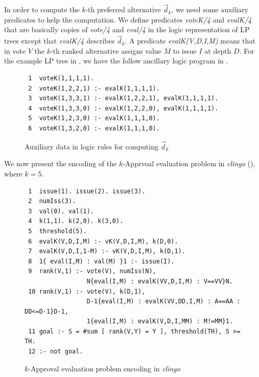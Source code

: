 In order to compute the $k$-th preferred alternative $\vec{d}_k$, we need
some auxiliary predicates to help the computation.  We define predicates
\textit{voteK/4} and \textit{evalK/4} that are basically copies 
of \textit{vote/4} and \textit{eval/4} in
the logic representation of LP trees except that \textit{evalK/4} describes
$\vec{d}_k$.  A predicate \textit{evalK(V,D,I,M)} means that in vote $V$
the $k$-th ranked alternative assigns value $M$ to issue $I$ at depth $D$.
For the example LP tree in , we have the follow ancillary
logic program in .

\begin{figure}[H]
   \small
	\begin{framed}
		\begin{verbatim}
 1  voteK(1,1,1,1).
 2  voteK(1,2,2,1) :- evalK(1,1,1,1).
 3  voteK(1,3,3,1) :- evalK(1,2,2,1), evalK(1,1,1,1).
 4  voteK(1,3,3,0) :- evalK(1,2,2,0), evalK(1,1,1,1).
 5  voteK(1,2,3,0) :- evalK(1,1,1,0).
 6  voteK(1,3,2,0) :- evalK(1,1,1,0).
		\end{verbatim}
	\end{framed}
	\caption{Auxiliary data in logic rules for computing $\vec{d}_k$ }
  \label{fig:LPTreeASP_aux}
\end{figure}

We now present the encoding of the $k$-Apprvoal evaluation problem in \emph{clingo}
(), where $k=5$.
\begin{figure}[ht]
  \centering
	\begin{framed}
	\small
		\begin{verbatim}
 1  issue(1). issue(2). issue(3).
 2  numIss(3).
 3  val(0). val(1).
 4  k(1,1). k(2,0). k(3,0).
 5  threshold(5).
 6  evalK(V,D,I,M) :- vK(V,D,I,M), k(D,0).
 7  evalK(V,D,I,1-M) :- vK(V,D,I,M), k(D,1).
 8  1{ eval(I,M) : val(M) }1 :- issue(I).
 9  rank(V,1) :- vote(V), numIss(N),
                 N{eval(I,M) : evalK(VV,D,I,M) : V==VV}N.
 10 rank(V,1) :- vote(V), k(D,1), 
                 D-1{eval(I,M) : evalK(VV,DD,I,M) : A==AA : DD<=D-1}D-1,
                 1{eval(I,M) : evalK(V,D,I,MM) : M!=MM}1.
 11 goal :- S = #sum [ rank(V,Y) = Y ], threshold(TH), S >= TH.
 12 :- not goal.
		\end{verbatim}
	\end{framed}
	\caption{$k$-Approval evaluation problem encoding in \emph{clingo}}
	\label{fig:clingo:kEval}
\end{figure}


